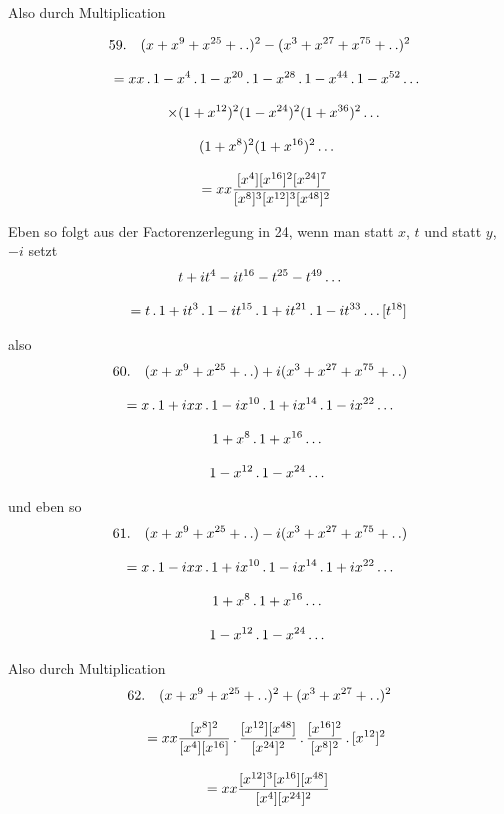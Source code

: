 Also durch Multiplication

\[
\begin{gathered}
59.\quad{}
(x+x^9+x^{25}+ .\,. )^2-(x^3+x^{27}+x^{75}+ .\,. )^2\\[8pt]
\quad=xx\,.\,1-x^4\,.\,1-x^{20}\,.\,1-x^{28}\,.\,1-x^{44}\,.\,1-x^{52}\mathinner{.\,.\,.}\\[8pt]
\qquad\times(1+x^{12})^2(1-x^{24})^2(1+x^{36})^2\mathinner{.\,.\,.}\\[8pt]\quad{}(1+x^8)^2(1+x^{16})^2\mathinner{.\,.\,.}\\[8pt]
\quad=xx\frac{[x^4][x^{16}]^2[x^{24}]^7}{[x^8]^3[x^{12}]^3[x^{48}]^2}
\end{gathered}
\]

Eben so folgt aus der Factorenzerlegung in 24, wenn man statt \(x\), \(t\) und
statt \(y\), \(-i\) setzt
\[
\begin{gathered}t+it^4-it^{16}-t^{25}-t^{49}\mathinner{.\,.\,.}\\[8pt]\quad{}=t\,.\,1+it^3\,.\,1-it^{15}\,.\,1+it^{21}\,.\,1-it^{33}\mathinner{.\,.\,.}[t^{18}]\end{gathered}
\]

also
\[
\begin{gathered}
60.\quad{}
(x+x^9+x^{25}+\mathinner{.\,.})+i(x^3+x^{27}+x^{75}+\mathinner{.\,.})\\[8pt]
=x\,.\,1+ixx\,.\,1-ix^{10}\,.\,1+ix^{14}\,.\,1-ix^{22}\mathinner{.\,.\,.}\\[8pt]\quad{}1+x^8\,.\,1+x^{16}\mathinner{.\,.\,.}\\[8pt]\quad{}1-x^{12}\,.\,1-x^{24}\mathinner{.\,.\,.}
\end{gathered}
\]

und eben so
\[
\begin{gathered}
61.\quad{}
(x+x^9+x^{25}+\mathinner{.\,.})-i(x^3+x^{27}+x^{75}+\mathinner{.\,.})\\[8pt]
=x\,.\,1-ixx\,.\,1+ix^{10}\,.\,1-ix^{14}\,.\,1+ix^{22}\mathinner{.\,.\,.}\\[8pt]\quad{}1+x^8\,.\,1+x^{16}\mathinner{.\,.\,.}\\[8pt]\quad{}1-x^{12}\,.\,1-x^{24}\mathinner{.\,.\,.}
\end{gathered}
\]

Also durch Multiplication
\[
\begin{gathered}
62.\quad{}
(x+x^9+x^{25}+\mathinner{.\,.})^2+(x^3+x^{27}+ .\,. )^2\\[8pt]
\quad=xx\frac{[x^8]^2}{[x^4][x^{16}]}\,.\,\frac{[x^{12}][x^{48}]}{[x^{24}]^2}\,.\,\frac{[x^{16}]^2}{[x^8]^2}\,.\,[x^{12}]^2
\\[8pt]\quad{}=xx\frac{[x^{12}]^3[x^{16}][x^{48}]}{[x^4][x^{24}]^2}
\end{gathered}
\]

